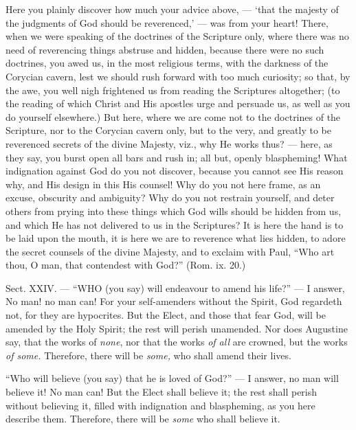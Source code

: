 Here you plainly discover how much your advice above, — ‘that the majesty of the judgments of God should be reverenced,’ — was from your heart! There, when we were speaking of the doctrines of the Scripture only, where there was no need of reverencing things abstruse and hidden, because there were no such doctrines, you awed us, in the most religious terms, with the darkness of the Corycian cavern, lest we should rush forward with too much curiosity; so that, by the awe, you well nigh frightened us from reading the Scriptures altogether; (to the reading of which Christ and His apostles urge and persuade us, as well as you do yourself elsewhere.) But here, where we are come not to the doctrines of the Scripture, nor to the Corycian cavern only, but to the very, and greatly to be reverenced secrets of the divine Majesty, viz., why He works thus? — here, as they say, you burst open all bars and rush in; all but, openly blaspheming! What indignation against God do you not discover, because you cannot see His reason why, and His design in this His counsel! Why do you not here frame, as an excuse, obscurity and ambiguity? Why do you not restrain yourself, and deter others from prying into these things which God wills should be hidden from us, and which He has not delivered to us in the Scriptures? It is here the hand is to be laid upon the mouth, it is here we are to reverence what lies hidden, to adore the secret counsels of the divine Majesty, and to exclaim with Paul, “Who art thou, O man, that contendest with God?” (Rom. ix. 20.)


Sect. XXIV. — “WHO (you say) will endeavour to amend his life?” — I answer, No man! no man can! For your self-amenders without the Spirit, God regardeth not, for they are hypocrites. But the Elect, and those that fear God, will be amended by the Holy Spirit; the rest will perish unamended. Nor does Augustine say, that the works of \emph{none}, nor that the works \emph{of all }are crowned, but the works \emph{of some. }Therefore, there will be \emph{some, }who shall amend their lives.

“Who will believe (you say) that he is loved of God?” — I answer, no man will believe it! No man can! But the Elect shall believe it; the rest shall perish without believing it, filled with indignation and blaspheming, as you here describe them. Therefore, there will be \emph{ some }who shall believe it.


